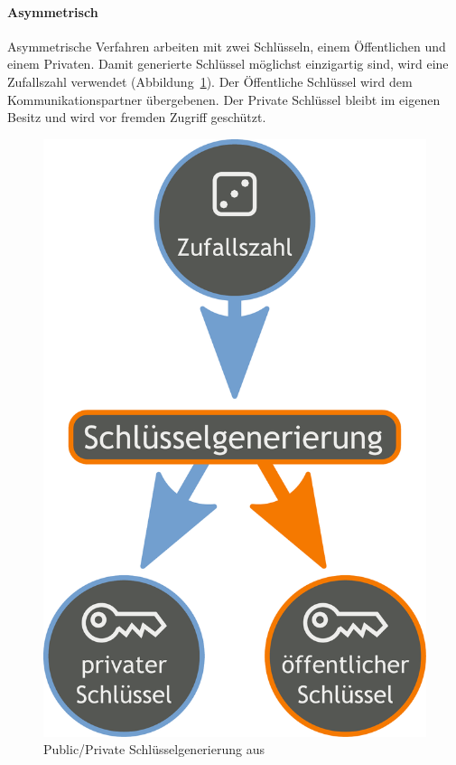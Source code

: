 \documentclass[11pt,a4paper]{report}
\begin{document}
\paragraph{Asymmetrisch} \label{sec:auth_asym}

Asymmetrische Verfahren arbeiten mit zwei Schlüsseln, einem Öffentlichen und einem Privaten. Damit generierte Schlüssel möglichst einzigartig sind, wird eine Zufallszahl verwendet (Abbildung~\ref{fig:pp_keygen}). Der Öffentliche Schlüssel wird dem Kommunikationspartner übergebenen. Der Private Schlüssel bleibt im eigenen Besitz und wird vor fremden Zugriff geschützt. 

\begin{figure}[htbp]
\centering
\includegraphics[scale=0.2]{images/public_private_keygeneration.pdf}
\caption{Public/Private Schlüsselgenerierung aus \cite{wiki_asym_crypto}}
\label{fig:pp_keygen}
\end{figure}
\end{document}
